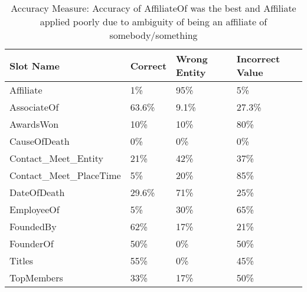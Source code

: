 \begin{table}
\caption{Accuracy Measure: Accuracy of AffiliateOf was the best and Affiliate applied poorly due to ambiguity of being an affiliate of somebody/something}
\centering
\label{table:finalresultaccuracy}
\begin{tabular}{|l|p{10mm}|p{10mm}|p{11mm}|}
\hline 
 \textbf{Slot Name}  & \textbf{Correct} & \textbf{Wrong Entity} & {\small \textbf{Incorrect Value}} \\ 
\hline 
Affiliate & 1\% & 95\% & 5\% \\ \hline 
AssociateOf & 63.6\% & 9.1\% & 27.3\%  \\ \hline 
AwardsWon & 10\% & 10\% & 80\%  \\ \hline 
CauseOfDeath & 0\% & 0\% & 0\%  \\ \hline 
Contact\_Meet\_Entity & 21\% & 42\% & 37\%  \\ \hline 
Contact\_Meet\_PlaceTime & 5\% & 20\% & 85\%  \\ \hline 
DateOfDeath & 29.6\% & 71\% & 25\%  \\ \hline 
EmployeeOf & 5\% & 30\% & 65\%  \\ \hline 
FoundedBy & 62\% & 17\% & 21\%  \\ \hline 
FounderOf & 50\% & 0\% & 50\%  \\ \hline 
Titles & 55\% & 0\% & 45\%  \\ \hline 
TopMembers & 33\% & 17\% & 50\%  \\ \hline 

\end{tabular} 
\end{table}









